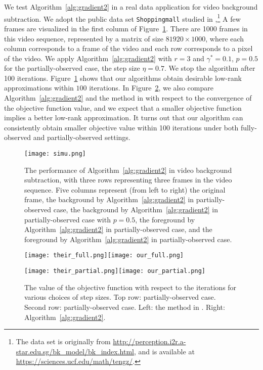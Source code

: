 \documentclass[12pt]{article}
\theoremstyle{plain}
\theoremstyle{definition}
\theoremstyle{plain}
\theoremstyle{plain}
\theoremstyle{remark}
\begin{document}
We test Algorithm~\ref{alg:gradient2} in a real data application for video background subtraction. We adopt the public data set \texttt{Shoppingmall} studied in \cite{DBLP:conf/nips/YiPCC16},\footnote{The data set is originally from \url{http://perception.i2r.a-star.edu.sg/bk_model/bk_index.html}, and is available at \url{https://sciences.ucf.edu/math/tengz/}.} A few frames are visualized in the first column of Figure~\ref{fig:DD3}. There are 1000 frames in this video sequence, represented by a matrix of size $81920\times 1000$, where each column corresponds to a frame of the video and each row corresponds to a pixel of the video. We apply Algorithm~\ref{alg:gradient2} with $r=3$ and $\gamma^*=0.1$, $p=0.5$ for the partially-observed case, the step size $\eta=0.7$. We stop the algorithm after 100 iterations. Figure~\ref{fig:DD3} shows that our algorithms obtain desirable low-rank approximations within $100$ iterations. In Figure~\ref{fig:DD4}, we also compare Algorithm~\ref{alg:gradient2} and the method in \cite{DBLP:conf/nips/YiPCC16} with respect to the convergence of the objective function value, and we expect that a smaller objective function implies a better low-rank approximation. It turns out that our algorithm can consistently obtain smaller objective value within 100 iterations under both fully-observed and partially-observed settings.



\begin{figure}
\centering\texttt{[image: simu.png]}
\caption{The performance of Algorithm~\ref{alg:gradient2} in video background subtraction, with three rows representing three frames in the video sequence. Five columns represent (from left to right) the original frame, the background by Algorithm~\ref{alg:gradient2} in partially-observed case, the background by Algorithm~\ref{alg:gradient2} in partially-observed case with $p=0.5$, the foreground by Algorithm~\ref{alg:gradient2} in partially-observed case, and the foreground  by Algorithm~\ref{alg:gradient2} in partially-observed case.}\label{fig:DD3}
\end{figure}

\begin{figure}
\centering\texttt{[image: their\_full.png]}\texttt{[image: our\_full.png]}


\centering\texttt{[image: their\_partial.png]}\texttt{[image: our\_partial.png]}

\caption{The value of the objective function with respect to the iterations for various choices of step sizes. Top row: partially-observed case. Second row: partially-observed case.  Left: the method in \cite{DBLP:conf/nips/YiPCC16}.  Right: Algorithm~\ref{alg:gradient2}.}\label{fig:DD4}
\end{figure}
\end{document}
